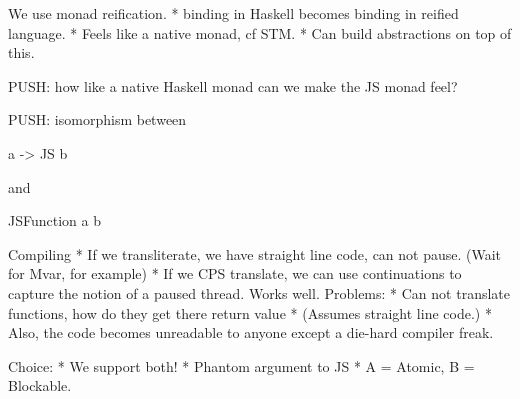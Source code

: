 \documentclass{llncs}
\begin{document}
We use monad reification.
 * binding in Haskell becomes binding in reified language.
 * Feels like a native monad, cf STM.
 * Can build abstractions on top of this.

PUSH: how like a native Haskell monad can we make the JS monad feel?

PUSH: isomorphism between 
 
   a -> JS b  

and

   JSFunction a b
 
Compiling
 * If we transliterate, we have straight line code, can not pause.
    (Wait for Mvar, for example)
 * If we CPS translate, we can use continuations to capture the
   notion of a paused thread. Works well.
   Problems:
     * Can not translate functions, how do they get there return value
     * (Assumes straight line code.)
     * Also, the code becomes unreadable to anyone except a die-hard 
       compiler freak.
 
Choice:
 * We support both!
 * Phantom argument to JS
 * A = Atomic, B = Blockable.

%
%
\end{document}
